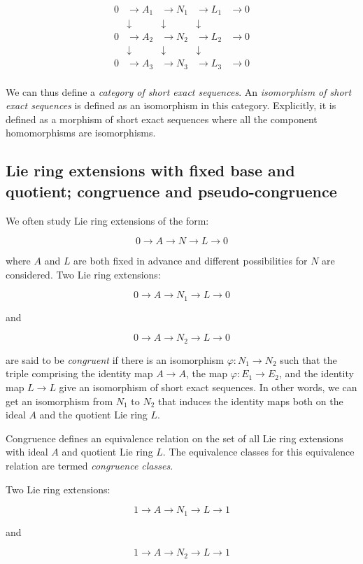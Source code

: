 \documentclass{ucetd}
\begin{document}
$$\begin{array}{rrrrr}
  0 & \to A_1 & \to N_1 & \to L_1 & \to 0 \\
  & \downarrow & \downarrow & \downarrow & \\
  0 & \to A_2 & \to N_2 & \to L_2 & \to 0 \\
  & \downarrow & \downarrow & \downarrow & \\
  0 & \to A_3 & \to N_3 & \to L_3 & \to 0 \\
\end{array}$$

We can thus define a {\em category of short exact sequences}. An
{\em isomorphism of short exact sequences} is defined as an
isomorphism in this category. Explicitly, it is defined as a morphism
of short exact sequences where all the component homomorphisms are
isomorphisms.

\subsection{Lie ring extensions with fixed base and quotient; congruence and pseudo-congruence}

We often study Lie ring extensions of the form:

$$0 \to A \to N \to L \to 0$$

where $A$ and $L$ are both fixed in advance and different
possibilities for $N$ are considered. Two Lie ring extensions:

$$0 \to A \to N_1 \to L \to 0$$

and

$$0 \to A \to N_2 \to L \to 0$$

are said to be {\em congruent} if there is an isomorphism $\varphi:
N_1 \to N_2$ such that the triple comprising the identity map $A \to
A$, the map $\varphi:E_1 \to E_2$, and the identity map $L \to L$ give
an isomorphism of short exact sequences. In other words, we can get an
isomorphism from $N_1$ to $N_2$ that induces the identity maps both on
the ideal $A$ and the quotient Lie ring $L$.

Congruence defines an equivalence relation on the set of all Lie ring
extensions with ideal $A$ and quotient Lie ring $L$. The
equivalence classes for this equivalence relation are termed {\em
  congruence classes}.

Two Lie ring extensions:

$$1 \to A \to N_1 \to L \to 1$$

and

$$1 \to A \to N_2 \to L \to 1$$
\end{document}
